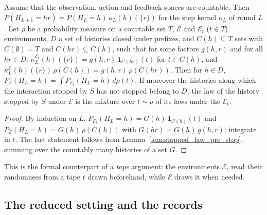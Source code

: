 \begin{lemma}
  \label{lem:hist_mixture}
  \leanok
  Assume that the observation, action and feedback spaces are countable. Then
  $P(H_{L+1} = h r) = P(H_L = h)\, \kappa_L(h)(\{r\})$ for the step kernel $\kappa_L$ of round $L$.
  Let $\rho$ be a probability measure on a countable set $T$, $\mathcal{E}$ and $\mathcal{E}_t$
  ($t \in T$) environments, $D$ a set of histories closed under prefixes, and $C(h) \subseteq T$
  sets with $C(\emptyset) = T$ and $C(h r) \subseteq C(h)$, such that for some factors $g(h, r)$ and
  for all $h r \in D$: $\kappa^{\mathcal{E}_t}_L(h)(\{r\}) = g(h, r)\, \mathbf{1}_{C(h r)}(t)$ for
  $t \in C(h)$, and $\kappa^{\mathcal{E}}_L(h)(\{r\})\, \rho(C(h)) = g(h, r)\, \rho(C(h r))$. Then
  for $h \in D$, $P_{\mathcal{E}}(H_L = h) = \int P_{\mathcal{E}_t}(H_L = h)\, d\rho(t)$. If
  moreover the histories along which the interaction stopped by $S$ has not stopped belong to $D$,
  the law of the history stopped by $S$ under $\mathcal{E}$ is the mixture over $t \sim \rho$ of its
  laws under the $\mathcal{E}_t$.
\end{lemma}

\begin{proof}
  \leanok
  By induction on $L$, $P_{\mathcal{E}_t}(H_L = h) = G(h)\, \mathbf{1}_{C(h)}(t)$ and
  $P_{\mathcal{E}}(H_L = h) = G(h)\, \rho(C(h))$ with $G(h r) = G(h)\, g(h, r)$; integrate in $t$.
  The last statement follows from Lemma~\ref{lem:stopped_law_pre_stop}, summing over the countably
  many histories of a set $G$.
\end{proof}

This is the formal counterpart of a \emph{tape} argument: the environments $\mathcal{E}_t$ read
their randomness from a tape $t$ drawn beforehand, while $\mathcal{E}$ draws it when needed.

\subsection{The reduced setting and the records}

